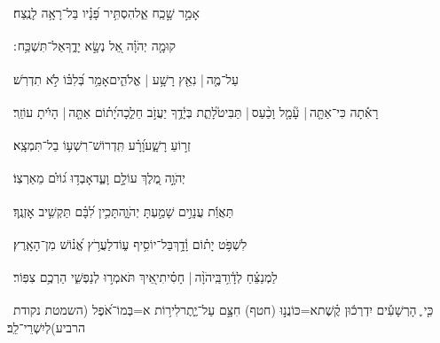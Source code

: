 \documentclass[12pt]{article}
\newcommand{\loc}[1]{\textsuperscript{\locf{#1}}}
\begin{document}
{\loc{ יא}~}‏אָמַ֣ר  שָׁ֣כַֽח אֵ֑ל{\hfill}הִסְתִּ֥יר פָּ֝נָ֗יו בַּל־רָאָ֥ה לָנֶֽצַח׃\par

{\loc{ יב}~}‏קוּמָ֤ה יְהֹוָ֗ה אֵ֭ל נְשָׂ֣א יָדֶ֑ךָ{\hfill}אַל־תִּשְׁכַּ֥ח ׃\par

{\loc{ יג}~}‏עַל־מֶ֤ה |  נִאֵ֖ץ רָשָׁ֥ע | אֱלֹהִ֑ים{\hfill}אָמַ֥ר בְּ֝לִבּ֗וֹ לֹ֣א תִדְרֹֽשׁ׃\par

{\loc{ יד}~}‏רָאִ֡תָה כִּי־אַתָּ֤ה |  עָ֘מָ֤ל וָכַ֨עַס |  תַּבִּיט֮{\hfill}לָתֵ֢ת בְּיָ֫דֶ֥ךָ\newline\hspace*{.5em} יַעֲזֹ֣ב חֵלֵ֑כָה{\hfill}יָ֝ת֗וֹם אַתָּ֤ה |  הָיִ֬יתָ עוֹזֵֽר׃\par

{\loc{ טו}~}‏ זְר֣וֹעַ רָשָׁ֑ע{\hfill}וָ֝רָ֗ע תִּֽדְרוֹשׁ־רִשְׁע֥וֹ בַל־תִּמְצָֽא׃\par

{\loc{ טז}~}‏יְהֹוָ֣ה מֶ֭לֶךְ עוֹלָ֣ם וָעֶ֑ד{\hfill}אָבְד֥וּ ג֝וֹיִ֗ם מֵאַרְצֽוֹ׃\par

{\loc{ יז}~}‏תַּאֲוַ֬ת עֲנָוִ֣ים שָׁמַ֣עְתָּ יְהֹוָ֑ה{\hfill}תָּכִ֥ין לִ֝בָּ֗ם תַּקְשִׁ֥יב אׇזְנֶֽךָ׃\par

{\loc{ יח}~}‏לִשְׁפֹּ֥ט יָת֗וֹם וָ֫דָ֥ךְ{\hfill}בַּל־יוֹסִ֥יף ע֑וֹד\newline\hspace*{.5em}לַעֲרֹ֥ץ אֱ֝נ֗וֹשׁ מִן־הָאָֽרֶץ׃\par\pend
\ledpb
\pstart[\subsection*{\textcolor{red}{פרק יא}}]\label{פרק יא}
{\loc{ א}~}‏לַמְנַצֵּ֗חַ לְדָ֫וִ֥ד\newline\hspace*{.5em}בַּֽיהֹוָ֨ה |  חָסִ֗יתִי{\hfill}אֵ֭יךְ תֹּאמְר֣וּ לְנַפְשִׁ֑י\newline\hspace*{.5em} הַרְכֶ֥ם צִפּֽוֹר׃\par

{\loc{ ב}~}‏כִּ֤י ֪ הָרְשָׁעִ֡ים יִדְרְכ֬וּן קֶ֗שֶׁת{\hfill}א=כּוֹנֲנ֣וּ (חטף) חִצָּ֣ם עַל־יֶ֑תֶר\newline\hspace*{.5em}לִיר֥וֹת א=בְּמוֹ־אֹ֝פֶל (השמטת נקודת הרביע){\hfill}לְיִשְׁרֵי־לֵֽב׃\par
\end{document}
